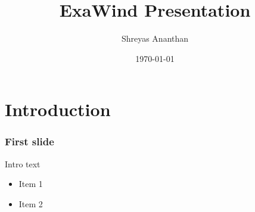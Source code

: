 \documentclass[aspectratio=1610,fleqn]{beamer}
\title{ExaWind Presentation}
\author{Shreyas Ananthan}
\institute[NREL]{National Renewable Energy Laboratory \\ Golden, CO}
\date{\today}
\begin{document}
\maketitle

\section{Introduction}

\begin{frame}
  \frametitle{First slide}
  Intro text
  \begin{itemize}
  \item Item 1
  \item Item 2
  \end{itemize}
\end{frame}

\ecpacknowledge{}
\end{document}
